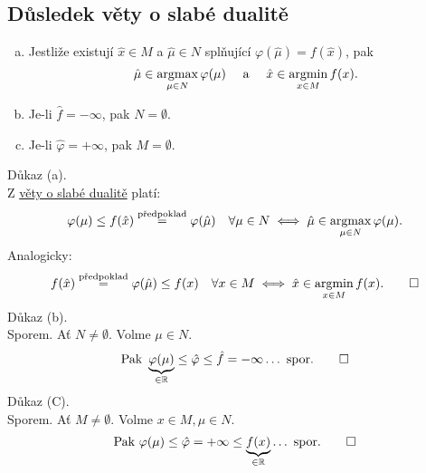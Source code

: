 \subsection{Důsledek věty o slabé dualitě}
\begin{enumerate}[(a)]
    \item Jestliže existují $\hat x \in M$ a $\hat \mu \in N$ splňující $\varphi(\hat \mu) = f(\hat x)$, pak
    \[ \hat \mu \in \operatorname*{argmax}_{\mu \in N} \varphi(\mu) \quad \text{ a } \quad \hat x \in \operatorname*{argmin}_{x \in M}f(x). \]
    \item Je-li $\hat f = - \infty$, pak $N = \emptyset$.
    \item Je-li $\hat \varphi = + \infty$, pak $M = \emptyset$.
\end{enumerate}
Důkaz (a).\\
Z \hyperref[slabDual]{věty o slabé dualitě} platí:
\[
    \varphi(\mu) \leq f(\hat x) \overset{\text{předpoklad}}{=} \varphi(\hat \mu) \quad \forall \mu \in N
    \iff \hat \mu \in \operatorname*{argmax}_{\mu \in N} \varphi(\mu).
\]
Analogicky:
\[
    f(\hat x) \overset{\text{předpoklad}}{=} \varphi(\hat \mu) \leq f(x) \quad \forall x \in M
    \iff \hat x \in \operatorname*{argmin}_{x \in M} f(x). \qed
\]
Důkaz (b).\\
Sporem. Ať $N \not= \emptyset$. Volme $\mu \in N$.
\[
    \text{Pak } \underbrace{\varphi(\mu)}_{\in \mathbb{R}} \leq \hat \varphi \leq \hat f = - \infty \dots \text{ spor.} \qed
\]
Důkaz (C).\\
Sporem. Ať $M \not= \emptyset$. Volme $x \in M, \mu \in N$.
\[
    \text{Pak } \varphi(\mu) \leq \hat \varphi = + \infty \leq \underbrace{f(x)}_{\in \mathbb{R}} \dots \text{ spor.} \qed
\]


